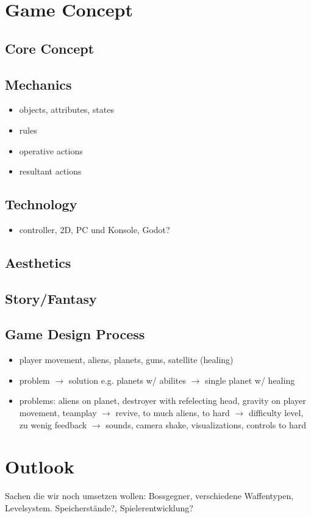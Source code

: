 \documentclass[11pt]{article}
\begin{document}
\section{Game Concept}
\subsection{Core Concept}
\subsection{Mechanics}
\begin{itemize}
\item objects, attributes, states
\item rules
\item operative actions
\item resultant actions
\end{itemize}
\subsection{Technology}
\begin{itemize}
\item controller, 2D, PC und Konsole, Godot?
\end{itemize}
\subsection{Aesthetics}
\subsection{Story/Fantasy}
\subsection{Game Design Process}
\begin{itemize}
\item player movement, aliens, planets, guns, satellite (healing)
\item problem $\rightarrow$ solution e.g. planets w/ abilites $\rightarrow$ single planet w/ healing
\item problems: aliens on planet, destroyer with refelecting head, gravity on player movement, teamplay $\rightarrow$ revive, to much aliens, to hard $\rightarrow$ difficulty level, zu wenig feedback $\rightarrow$ sounds, camera shake, visualizations, controls to hard
\end{itemize}
\section{Outlook}
Sachen die wir noch umsetzen wollen: Bossgegner, verschiedene Waffentypen, Levelsystem. Speicherstände?, Spielerentwicklung?
\end{document}

